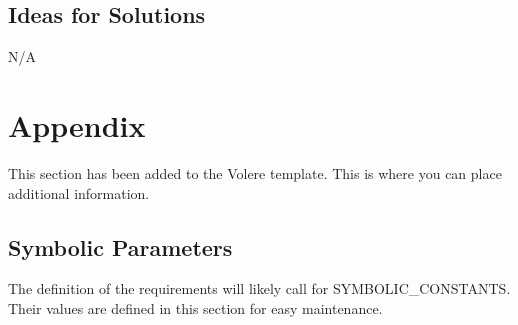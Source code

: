 \documentclass[11pt]{article}
\begin{document}
\subsection{Ideas for Solutions}
N/A





\newpage

\section{Appendix}

This section has been added to the Volere template.  This is where you can place
additional information.

\subsection{Symbolic Parameters}

The definition of the requirements will likely call for SYMBOLIC\_CONSTANTS.
Their values are defined in this section for easy maintenance.
\end{document}
